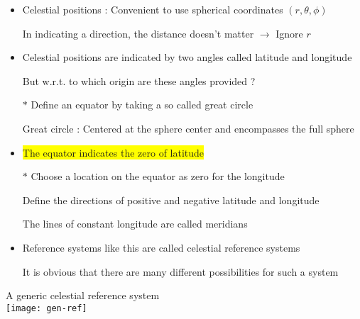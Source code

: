 \onecolumn
\begin{itemize}
\item Celestial positions : Convenient to use spherical coordinates $(r,\theta,\phi)$
\item[] In indicating a direction, the distance doesn't matter $\rightarrow$ Ignore $r$
\item Celestial positions are indicated by two angles called {\blue latitude} and {\blue longitude}
\item[] But w.r.t. to which origin are these angles provided ?
\item[$\ast$] Define an {\blue equator} by taking a so called {\blue great circle}
\item[] Great circle : Centered at the sphere center and encompasses the full sphere
\item \colorbox{yellow}{The equator indicates the zero of latitude}
\item[$\ast$] {\blue Choose a location on the equator as zero for the longitude}
\item[] Define the directions of positive and negative latitude and longitude
\item[] The lines of constant longitude are called {\blue meridians}
\item Reference systems like this are called {\blue celestial reference systems}
\item[] It is obvious that there are many different possibilities for such a system 
\end{itemize}

\Tr
\onecolumn
\begin{center}
{\blue A generic celestial reference system}\\[3mm]
\texttt{[image: gen-ref]}
\end{center}

